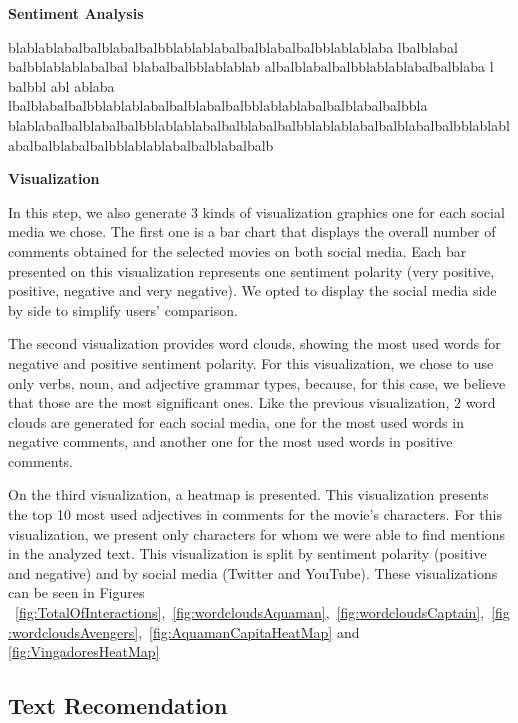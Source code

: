 \textbf{Sentiment Analysis}

blablablabalbalblabalbalbblablablabalbalblabalbalbblablablaba lbalblabal balbblablablabalbal blabalbalbblablablab albalblabalbalbblablablabalbalblaba l balbbl abl ablaba lbalblabalbalbblablablabalbalblabalbalbblablablabalbalblabalbalbbla blablabalbalblabalbalbblablablabalbalblabalbalbblablablabalbalblabalbalbblablablabalbalblabalbalbblablablabalbalblabalbalb

\textbf{Visualization}

In this step, we also generate 3 kinds of visualization graphics one for each social media we chose. The first one is a bar chart that displays the overall number of comments obtained for the selected movies on both social media. Each bar presented on this visualization represents one sentiment polarity (very positive, positive, negative and very negative). We opted to display the social media side by side to simplify users' comparison. 

The second visualization provides word clouds, showing the most used words for negative and positive sentiment polarity. For this visualization, we chose to use only verbs, noun, and adjective grammar types, because, for this case, we believe that those are the most significant ones. Like the previous visualization, 2 word clouds are generated for each social media, one for the most used words in negative comments, and another one for the most used words in positive comments. 

On the third visualization, a heatmap is presented. This visualization presents the top 10 most used adjectives in comments for the movie's characters. For this visualization, we present only characters for whom we were able to find mentions in the analyzed text. This visualization is split by sentiment polarity (positive and negative) and by social media (Twitter and YouTube). These visualizations can be seen in Figures ~\ref{fig:TotalOfInteractions},~\ref{fig:wordcloudsAquaman},~\ref{fig:wordcloudsCaptain},~\ref{fig:wordcloudsAvengers},~\ref{fig:AquamanCapitaHeatMap} and \ref{fig:VingadoresHeatMap}

\subsection{Text Recomendation}





